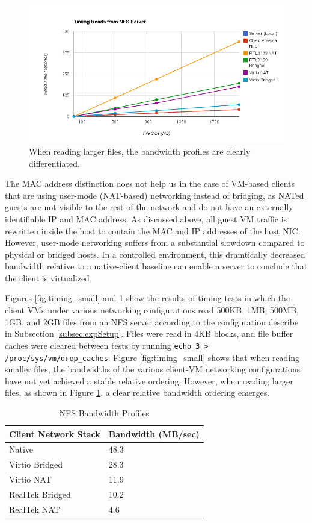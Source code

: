 \documentclass[11pt,pdftex,twocolumn]{article}
\begin{document}
\begin{figure}[!ht]
	\center
		\includegraphics[scale=0.3]{timing_large.png}
	\caption{When reading larger files, the bandwidth profiles are clearly differentiated.}
	\label{fig:timing_large}
\end{figure}

The MAC address distinction does not help us in the case of VM-based clients that are using user-mode (NAT-based) networking instead of bridging, as NATed guests are not visible to the rest of the network and do not have an externally identifiable IP and MAC address. As discussed above, all guest VM traffic is rewritten inside the host to contain the MAC and IP addresses of the host NIC. However, user-mode networking suffers from a substantial slowdown compared to physical or bridged hosts. In a controlled environment, this dramtically decreased bandwidth relative to a native-client baseline can enable a server to conclude that the client is virtualized. 

Figures \ref{fig:timing_small} and \ref{fig:timing_large} show the results of timing tests in which the client VMs under various networking configurations read 500KB, 1MB, 500MB, 1GB, and 2GB files from an NFS server according to the configuration describe in Subsection \ref{subsec:expSetup}. Files were read in 4KB blocks, and file buffer caches were cleared between tests by running \texttt{echo 3 > /proc/sys/vm/drop\_caches}. Figure \ref{fig:timing_small} shows that when reading smaller files, the bandwidths of the various client-VM networking configurations have not yet achieved a stable relative ordering. However, when reading larger files, as shown in Figure \ref{fig:timing_large}, a clear relative bandwidth ordering emerges.

\begin{table}[!ht]
	\centering
		\begin{tabular}{|l|l|}
			\hline
			\textbf{Client Network Stack} & \textbf{Bandwidth} (MB/sec) \\
			\hline
			Native & 48.3 \\
			Virtio Bridged & 28.3 \\
			Virtio NAT & 11.9 \\
			RealTek Bridged & 10.2 \\
			RealTek NAT & 4.6 \\
			\hline
		\end{tabular}
	\caption{NFS Bandwidth Profiles}
	\label{tab:NFSBandwidthProfiles}
\end{table}
\end{document}
